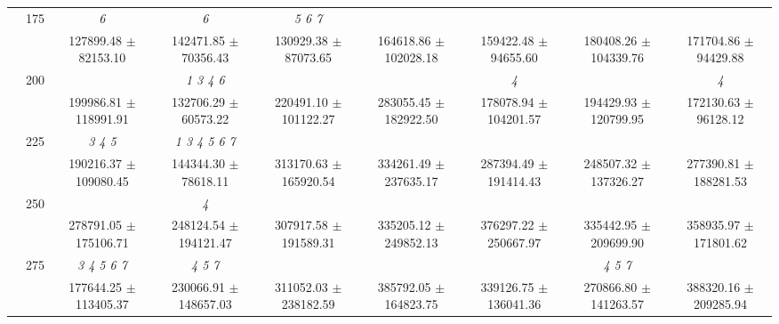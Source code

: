 \begin{table}[h]
{\begin{tabular}{
        ccccccccc}
 & \multirow{2}{*}{175}& \cellcolor[HTML]{EFEFEF} \textit{ 6 }& \cellcolor[HTML]{EFEFEF} \textit{ 6 }& \cellcolor[HTML]{EFEFEF} \textit{ 5 6 7 }& \cellcolor[HTML]{EFEFEF} & \cellcolor[HTML]{EFEFEF} & \cellcolor[HTML]{EFEFEF} & \cellcolor[HTML]{EFEFEF}  \\ 
 & & \cellcolor[HTML]{EFEFEF} 127899.48 $\pm$ 82153.10& \cellcolor[HTML]{EFEFEF} 142471.85 $\pm$ 70356.43& \cellcolor[HTML]{EFEFEF} 130929.38 $\pm$ 87073.65& \cellcolor[HTML]{EFEFEF} 164618.86 $\pm$ 102028.18& \cellcolor[HTML]{EFEFEF} 159422.48 $\pm$ 94655.60& \cellcolor[HTML]{EFEFEF} 180408.26 $\pm$ 104339.76& \cellcolor[HTML]{EFEFEF} 171704.86 $\pm$ 94429.88 \\ 
 & \multirow{2}{*}{200}& & \textit{ 1 3 4 6 }& & & \textit{ 4 }& & \textit{ 4 } \\ 
 & & 199986.81 $\pm$ 118991.91& 132706.29 $\pm$ 60573.22& 220491.10 $\pm$ 101122.27& 283055.45 $\pm$ 182922.50& 178078.94 $\pm$ 104201.57& 194429.93 $\pm$ 120799.95& 172130.63 $\pm$ 96128.12 \\ 
 & \multirow{2}{*}{225}& \cellcolor[HTML]{EFEFEF} \textit{ 3 4 5 }& \cellcolor[HTML]{EFEFEF} \textit{ 1 3 4 5 6 7 }& \cellcolor[HTML]{EFEFEF} & \cellcolor[HTML]{EFEFEF} & \cellcolor[HTML]{EFEFEF} & \cellcolor[HTML]{EFEFEF} & \cellcolor[HTML]{EFEFEF}  \\ 
 & & \cellcolor[HTML]{EFEFEF} 190216.37 $\pm$ 109080.45& \cellcolor[HTML]{EFEFEF} 144344.30 $\pm$ 78618.11& \cellcolor[HTML]{EFEFEF} 313170.63 $\pm$ 165920.54& \cellcolor[HTML]{EFEFEF} 334261.49 $\pm$ 237635.17& \cellcolor[HTML]{EFEFEF} 287394.49 $\pm$ 191414.43& \cellcolor[HTML]{EFEFEF} 248507.32 $\pm$ 137326.27& \cellcolor[HTML]{EFEFEF} 277390.81 $\pm$ 188281.53 \\ 
 & \multirow{2}{*}{250}& & \textit{ 4 }& & & & &  \\ 
 & & 278791.05 $\pm$ 175106.71& 248124.54 $\pm$ 194121.47& 307917.58 $\pm$ 191589.31& 335205.12 $\pm$ 249852.13& 376297.22 $\pm$ 250667.97& 335442.95 $\pm$ 209699.90& 358935.97 $\pm$ 171801.62 \\ 
 & \multirow{2}{*}{275}& \cellcolor[HTML]{EFEFEF} \textit{ 3 4 5 6 7 }& \cellcolor[HTML]{EFEFEF} \textit{ 4 5 7 }& \cellcolor[HTML]{EFEFEF} & \cellcolor[HTML]{EFEFEF} & \cellcolor[HTML]{EFEFEF} & \cellcolor[HTML]{EFEFEF} \textit{ 4 5 7 }& \cellcolor[HTML]{EFEFEF}  \\ 
 & & \cellcolor[HTML]{EFEFEF} 177644.25 $\pm$ 113405.37& \cellcolor[HTML]{EFEFEF} 230066.91 $\pm$ 148657.03& \cellcolor[HTML]{EFEFEF} 311052.03 $\pm$ 238182.59& \cellcolor[HTML]{EFEFEF} 385792.05 $\pm$ 164823.75& \cellcolor[HTML]{EFEFEF} 339126.75 $\pm$ 136041.36& \cellcolor[HTML]{EFEFEF} 270866.80 $\pm$ 141263.57& \cellcolor[HTML]{EFEFEF} 388320.16 $\pm$ 209285.94 \\ 

\end{tabular}}
\end{table}

